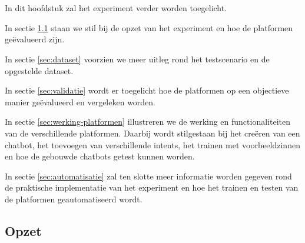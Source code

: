 
\chapter{}
\label{ch:methodologie}

In dit hoofdstuk zal het experiment verder worden toegelicht.

In sectie \ref{sec:opzet} staan we stil bij de opzet van het experiment en hoe de platformen geëvalueerd zijn.

In sectie \ref{sec:dataset} voorzien we meer uitleg rond het testscenario en de opgestelde dataset.

In sectie \ref{sec:validatie} wordt er toegelicht hoe de platformen op een objectieve manier geëvalueerd en vergeleken worden.

In sectie \ref{sec:werking-platformen} illustreren we de werking en functionaliteiten van de verschillende platformen. Daarbij wordt stilgestaan bij het creëren van een chatbot, het toevoegen van verschillende intents, het trainen met voorbeeldzinnen en hoe de gebouwde chatbots getest kunnen worden. 

In sectie \ref{sec:automatisatie} zal ten slotte meer informatie worden gegeven rond de praktische implementatie van het experiment en hoe het trainen en testen van de platformen geautomatiseerd wordt.


\section{Opzet}
\label{sec:opzet}

